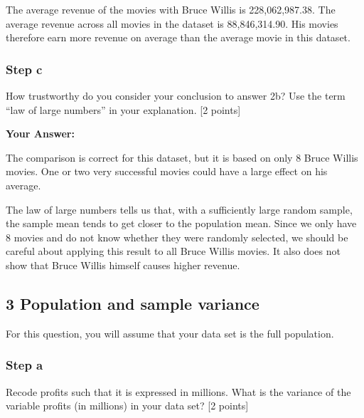 \documentclass[
]{article}
\newenvironment{Shaded}{\begin{snugshade}}{\end{snugshade}}
\newcommand{\AttributeTok}[1]{\textcolor[rgb]{0.13,0.29,0.53}{#1}}
\newcommand{\CommentTok}[1]{\textcolor[rgb]{0.56,0.35,0.01}{\textit{#1}}}
\newcommand{\ConstantTok}[1]{\textcolor[rgb]{0.56,0.35,0.01}{#1}}
\newcommand{\DocumentationTok}[1]{\textcolor[rgb]{0.56,0.35,0.01}{\textbf{\textit{#1}}}}
\newcommand{\FunctionTok}[1]{\textcolor[rgb]{0.13,0.29,0.53}{\textbf{#1}}}
\newcommand{\NormalTok}[1]{#1}
\newcommand{\SpecialCharTok}[1]{\textcolor[rgb]{0.81,0.36,0.00}{\textbf{#1}}}
\newcommand{\StringTok}[1]{\textcolor[rgb]{0.31,0.60,0.02}{#1}}
\begin{document}
The average revenue of the movies with Bruce Willis is 228,062,987.38.
The average revenue across all movies in the dataset is 88,846,314.90.
His movies therefore earn more revenue on average than the average movie
in this dataset.

\subsubsection{Step c}\label{step-c-1}

How trustworthy do you consider your conclusion to answer 2b? Use the
term ``law of large numbers'' in your explanation. {[}2 points{]}

\begin{Shaded}
\end{Shaded}

\textbf{Your Answer:}

The comparison is correct for this dataset, but it is based on only 8
Bruce Willis movies. One or two very successful movies could have a
large effect on his average.

The law of large numbers tells us that, with a sufficiently large random
sample, the sample mean tends to get closer to the population mean.
Since we only have 8 movies and do not know whether they were randomly
selected, we should be careful about applying this result to all Bruce
Willis movies. It also does not show that Bruce Willis himself causes
higher revenue.

\subsection{3 Population and sample
variance}\label{population-and-sample-variance}

For this question, you will assume that your data set is the full
population.

\subsubsection{Step a}\label{step-a-2}

Recode profits such that it is expressed in millions. What is the
variance of the variable profits (in millions) in your data set? {[}2
points{]}
\end{document}
